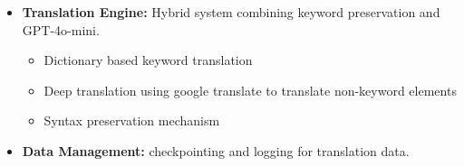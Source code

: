 \documentclass[20pt]{extarticle}
\begin{document}
{\begin{tcolorbox}[title=\centering {System Architecture}]
\begin{itemize}
        \item \textbf{Translation Engine:} Hybrid system combining keyword preservation and GPT-4o-mini.
            \begin{itemize}
                \item Dictionary based keyword translation
                \item Deep translation using google translate to translate non-keyword elements
                \item Syntax preservation mechanism
            \end{itemize}
        
        \item \textbf{Data Management:} 
              checkpointing and logging for translation data.
    \end{itemize}
\end{tcolorbox}
}
\end{document}
